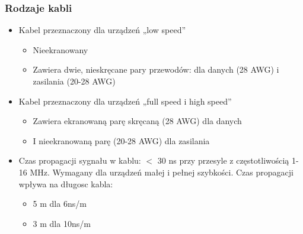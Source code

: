 		\subsubsection{Rodzaje kabli}
			\begin{itemize}
				\item Kabel przeznaczony dla urządzeń „low speed”
				\begin{itemize}
					\item Nieekranowany
					\item Zawiera dwie, nieskręcane pary przewodów: dla danych (28 AWG) i zasilania (20-28 AWG)
				\end{itemize}
				\item Kabel przeznaczony dla urządzeń „full speed i high speed”
				\begin{itemize}
					\item Zawiera ekranowaną parę skręcaną (28 AWG) dla danych
					\item I nieekranowaną parę (20-28 AWG) dla zasilania
				\end{itemize}
				\item Czas propagacji sygnału w kablu: $<$ 30 ns przy przesyle z częstotliwością 1-16 MHz. Wymagany dla urządzeń małej i pełnej szybkości. Czas propagacji wpływa na długosc kabla:
				\begin{itemize}
					\item 5 m dla 6ns/m
					\item 3 m dla 10ns/m
				\end{itemize}
			\end{itemize}
